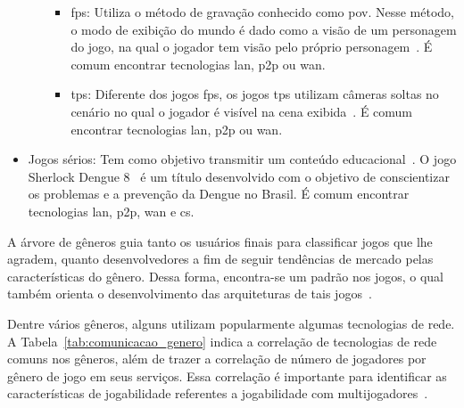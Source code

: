 \begin{itemize}
\begin{itemize}
\begin{itemize}
          \item \ac{fps}: Utiliza o método de gravação conhecido como \ac{pov}. Nesse método, o modo de exibição do mundo é dado como a visão de um personagem do jogo, na qual o jogador tem visão pelo próprio personagem~\cite{video_game_technologies, adams_1208533}. É comum encontrar tecnologias \ac{lan}, \ac{p2p} ou \ac{wan}.
          \item \ac{tps}: Diferente dos jogos \ac{fps}, os jogos \ac{tps} utilizam câmeras soltas no cenário no qual o jogador é visível na cena exibida~\cite{video_game_technologies, adams_1208533}. É comum encontrar tecnologias \ac{lan}, \ac{p2p} ou \ac{wan}.
        \end{itemize}
    \end{itemize}
  \item Jogos sérios: Tem como objetivo transmitir um conteúdo educacional~\cite{video_game_technologies}. O jogo Sherlock Dengue 8~\cite{sherlock_dengue} é um título desenvolvido com o objetivo de conscientizar os problemas e a prevenção da Dengue no Brasil. É comum encontrar tecnologias \ac{lan}, \ac{p2p}, \ac{wan} e \ac{cs}.
\end{itemize}

A árvore de gêneros guia tanto os usuários finais para classificar jogos que lhe agradem, quanto desenvolvedores a fim de seguir tendências de mercado pelas características do gênero.
%
Dessa forma, encontra-se um padrão nos jogos, o qual também orienta o desenvolvimento das arquiteturas de tais jogos~\cite{video_game_technologies}.

Dentre vários gêneros, alguns utilizam popularmente algumas tecnologias de rede.
%
A Tabela~\ref{tab:comunicacao_genero} indica a correlação de tecnologias de rede comuns nos gêneros, além de trazer a correlação de número de jogadores por gênero de jogo em seus serviços.
%
Essa correlação é importante para identificar as características de jogabilidade referentes a jogabilidade com multijogadores~\cite{video_game_technologies}.


